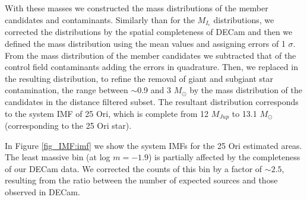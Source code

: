 \documentclass[12pt]{article}
\begin{document}
With these masses we constructed the mass distributions of the member candidates and contaminants. Similarly than for the $M_{I_c}$ distributions, we corrected the distributions by the spatial completeness of DECam and then we defined the mass distribution using the mean values and assigning errors of 1 $\sigma$. From the mass distribution of the member candidates we subtracted that of the control field contaminants adding the errors in quadrature. Then, we replaced in the resulting distribution, to refine the removal of giant and subgiant star contamination, the range between $\sim$0.9 and 3 $M_\odot$ by the mass distribution of the candidates in the distance filtered subset. The resultant distribution corresponds to the system IMF of 25 Ori, which is complete from 12 $M_{Jup}$ to 13.1 $M_\odot$ (corresponding to the 25 Ori star).

In Figure \ref{fig_IMF:imf} we show the system IMFs for the 25 Ori estimated areas. The least massive bin (at log $m=-1.9$) is partially affected by the completeness of our DECam data. We corrected the counts of this bin by a factor of $\sim2.5$, resulting from the ratio between the number of expected sources and those observed in DECam. 
\end{document}
